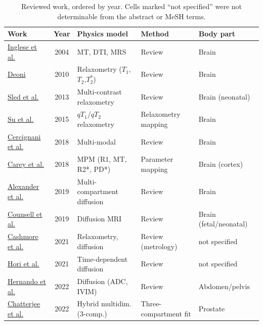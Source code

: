 \documentclass[sn-mathphys,Numbered]{sn-jnl}
\begin{document}
\begin{table}[t]
  \caption{Reviewed work, ordered by year. Cells marked ``not specified'' were not
  determinable from the abstract or MeSH terms.}\label{tab:related}
  \footnotesize
  \setlength{\tabcolsep}{3pt}
  \begin{tabularx}{\textwidth}{@{}>{\raggedright\arraybackslash}p{2.2cm} c >{\raggedright\arraybackslash}X >{\raggedright\arraybackslash}X >{\raggedright\arraybackslash}p{2.0cm}@{}}
    \toprule
    Work & Year & Physics model & Method & Body part \\
    \midrule
    \href{https://pubmed.ncbi.nlm.nih.gov/16041287/}{Inglese et al.} & 2004 & MT, DTI, MRS & Review & Brain \\
    \href{https://pubmed.ncbi.nlm.nih.gov/21613875/}{Deoni} & 2010 & Relaxometry ($T_1$,$T_2$,$T_2^{*}$) & Review & Brain \\
    \href{https://pubmed.ncbi.nlm.nih.gov/23872867/}{Sled et al.} & 2013 & Multi-contrast relaxometry & Review & Brain (neonatal) \\
    \href{https://pubmed.ncbi.nlm.nih.gov/25355453/}{Su et al.} & 2015 & $qT_1$/$qT_2$ relaxometry & Relaxometry mapping & Brain \\
    \href{https://pubmed.ncbi.nlm.nih.gov/29097317/}{Cercignani et al.} & 2018 & Multi-modal & Review & Brain \\
    \href{https://pubmed.ncbi.nlm.nih.gov/29203455/}{Carey et al.} & 2018 & MPM (R1, MT, R2*, PD*) & Parameter mapping & Brain (cortex) \\
    \href{https://pubmed.ncbi.nlm.nih.gov/29193413/}{Alexander et al.} & 2019 & Multi-compartment diffusion & Review & Brain \\
    \href{https://pubmed.ncbi.nlm.nih.gov/31324329/}{Counsell et al.} & 2019 & Diffusion MRI & Review & Brain (fetal/neonatal) \\
    \href{https://pubmed.ncbi.nlm.nih.gov/33710907/}{Cashmore et al.} & 2021 & Relaxometry, diffusion & Review (metrology) & not specified \\
    \href{https://pubmed.ncbi.nlm.nih.gov/33902899/}{Hori et al.} & 2021 & Time-dependent diffusion & Review & not specified \\
    \href{https://pubmed.ncbi.nlm.nih.gov/34554579/}{Hernando et al.} & 2022 & Diffusion (ADC, IVIM) & Review & Abdomen/pelvis \\
    \href{https://pubmed.ncbi.nlm.nih.gov/34751615/}{Chatterjee et al.} & 2022 & Hybrid multidim. (3-comp.) & Three-compartment fit & Prostate \\

\end{tabularx}
\end{table}
\end{document}
